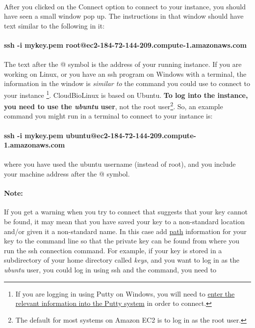 \paragraph{}After you clicked on the Connect option to connect to your instance, you should have seen a small window pop up. The instructions in that window should have text similar to the following in it: 

\paragraph{ssh -i mykey.pem root@ec2-184-72-144-209.compute-1.amazonaws.com}

\paragraph{}The text after the @ symbol is the address of your running instance. If you are working on Linux, or you have an ssh program on Windows with a terminal, the information in the window is \emph{similar to} the command you could use to connect to your instance \footnote{If you are logging in using Putty on Windows, you will need to \href{http://www.ualberta.ca/CNS/RESEARCH/LinuxClusters/pka-putty.html}{enter the relevant information into the Putty system} in order to connect.}. CloudBioLinux is based on Ubuntu. \textbf{To log into the instance, you need to use the \emph{ubuntu} user}, not the root user\footnote{The default for most systems on Amazon EC2 is to log in as the root user.}. So, an example command you might run in a terminal to connect to your instance is:

\paragraph{ssh -i mykey.pem ubuntu@ec2-184-72-144-209.compute-1.amazonaws.com}

\paragraph{}where you have used the ubuntu username (instead of root), and you include your machine address after the @ symbol.

\paragraph{Note:} If you get a warning when you try to connect that suggests that your key cannot be found, it may mean that you have saved your key to a non-standard location and/or given it a non-standard name. In this case add \href{http://nebc.nerc.ac.uk/tools/bio-linux/bio-linux-faq\#path}{path} information for your key to the command line so that the private key can be found from where you run the ssh connection command. For example, if your key is stored in a subdirectory of your home directory called \emph{keys}, and you want to log in as the \emph{ubuntu} user, you could log in using ssh and the command, you need to


